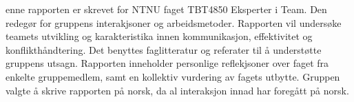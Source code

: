 enne rapporten er skrevet for NTNU faget TBT4850 Eksperter i Team. Den redegør for gruppens interakjsoner og arbeidsmetoder. 
Rapporten vil undersøke teamets utvikling og karakteristika innen kommunikasjon, effektivitet og konflikthåndtering.
Det benyttes faglitteratur og referater til å understøtte gruppens utsagn. 
Rapporten inneholder personlige reflekjsoner over faget fra enkelte gruppemedlem, samt en kollektiv vurdering av fagets utbytte. 
Gruppen valgte å skrive rapporten på norsk, da al interaksjon innad har foregått på norsk. 